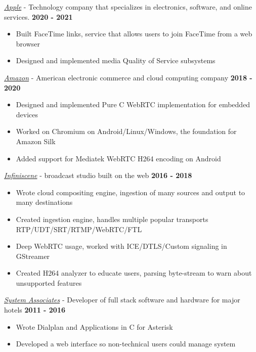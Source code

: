 \documentclass{res}
\begin{document}
\begin{resume}
\href{https://apple.com/}{{\it Apple}} - Technology company that specializes in electronics, software, and online services.  \hfill {\bf 2020 - 2021\space \space \space}
\begin{itemize}  \itemsep -2pt
    \item Built FaceTime links, service that allows users to join FaceTime from a web browser
    \item Designed and implemented media Quality of Service subsystems
\end{itemize}

\href{https://amazon.com/}{{\it Amazon}} - American electronic commerce and cloud computing company \hfill {\bf 2018 - 2020\space \space \space}
\begin{itemize}  \itemsep -2pt
    \item Designed and implemented Pure C WebRTC implementation for embedded devices
    \item Worked on Chromium on Android/Linux/Windows, the foundation for Amazon Silk
    \item Added support for Mediatek WebRTC H264 encoding on Android
\end{itemize}

\href{https://infiniscene.com/}{{\it Infiniscene}} - broadcast studio built on the web \hfill {\bf 2016 - 2018}
\begin{itemize}  \itemsep -2pt
    \item Wrote cloud compositing engine, ingestion of many sources and output to many destinations
    \item Created ingestion engine, handles multiple popular transports RTP/UDT/SRT/RTMP/WebRTC/FTL
    \item Deep WebRTC usage, worked with ICE/DTLS/Custom signaling in GStreamer
    \item Created H264 analyzer to educate users, parsing byte-stream to warn about unsupported features
\end{itemize}

\href{http://www.saicorporate.com}{{\it System Associates}} - Developer of full stack software and hardware for major hotels {\bf \hfill 2011 - 2016 }
\begin{itemize}  \itemsep -2pt
    \item Wrote Dialplan and Applications in C for Asterisk
    \item Developed a web interface so non-technical users could manage system
\end{itemize}


\end{resume}
\end{document}

